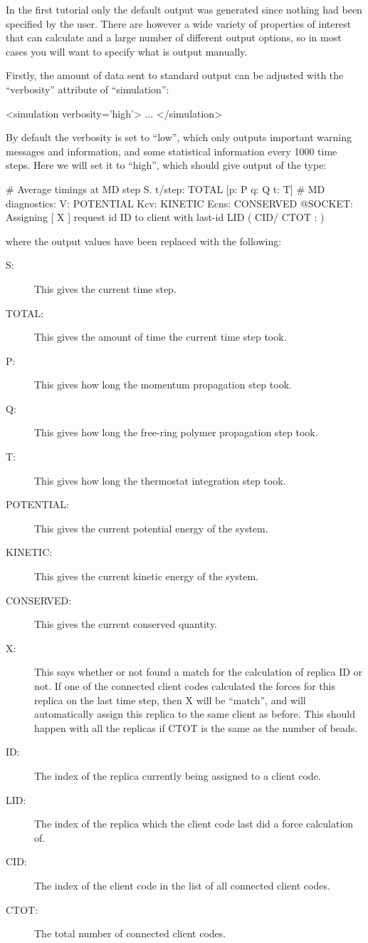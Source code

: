 \documentclass[11pt,english,fleqn]{report}
\newenvironment{code}{%
\footnotesize 
\verbatim
}{
\endverbatim
\normalsize
}
\begin{document}
In the first tutorial only the default output was generated since 
nothing had been specified by the user. There are however a wide
variety of properties of interest that \ipi can calculate 
and a large number of different output
options, so in most cases you will want to specify what is output
manually.

Firstly, the amount of data sent to standard output can be adjusted
with the {}``verbosity'' attribute of {}``simulation'':

\begin{code}
<simulation verbosity='high'>
   ...
</simulation>
\end{code}

By default the verbosity is set to {}``low'', which only outputs
important warning messages and information, and some statistical 
information every 1000 time steps. Here we will set it to 
{}``high'', which should give output of the type:

\small
\begin{code}
 # Average timings at MD step S. t/step: TOTAL [p: P q: Q t: T]
 # MD diagnostics: V: POTENTIAL Kcv: KINETIC Ecns: CONSERVED
 @SOCKET: Assigning [ X ] request id ID to client with last-id LID ( CID/ CTOT : )
\end{code}
\normalsize
where the output values have been replaced with the following:
\begin{description}
\item [{S:}] This gives the current time step.
\item[{TOTAL:}] This gives the amount of time the current time step took.
\item [{P:}] This gives how long the momentum propagation step took.
\item [{Q:}] This gives how long the free-ring polymer propagation step took.
\item [{T:}] This gives how long the thermostat integration step took.
\item [{POTENTIAL:}] This gives the current potential energy of the system.
\item [{KINETIC:}] This gives the current kinetic energy of the system.
\item [{CONSERVED:}] This gives the current conserved quantity.
\item [{X:}] This says whether or not \ipi found a match for the calculation of 
replica ID or not.
If one of the connected client codes calculated the forces for this replica on the
last time step, then X will be {}``match'', and \ipi will automatically assign
this replica to the same client as before. This should happen with all the replicas
if CTOT is the same as the number of beads.
\item [{ID:}] The index of the replica currently being assigned to a client code.
\item [{LID:}] The index of the replica which the client code last did a force calculation
of.
\item [{CID:}] The index of the client code in the list of all connected client codes.
\item [{CTOT:}] The total number of connected client codes.
\end{description}
\end{document}
